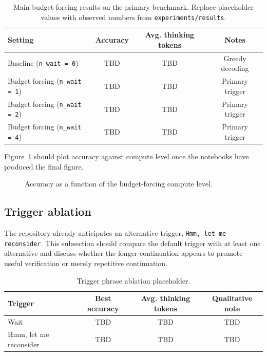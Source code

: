 \begin{table}[t]
\centering
\caption{Main budget-forcing results on the primary benchmark. Replace placeholder values with observed numbers from \texttt{experiments/results}.}
\label{tab:main-results}
\begin{tabular}{lccc}
\toprule
Setting & Accuracy & Avg. thinking tokens & Notes \\
\midrule
Baseline (\texttt{n\_wait = 0}) & TBD & TBD & Greedy decoding \\
Budget forcing (\texttt{n\_wait = 1}) & TBD & TBD & Primary trigger \\
Budget forcing (\texttt{n\_wait = 2}) & TBD & TBD & Primary trigger \\
Budget forcing (\texttt{n\_wait = 4}) & TBD & TBD & Primary trigger \\
\bottomrule
\end{tabular}
\end{table}

Figure~\ref{fig:acc-compute} should plot accuracy against compute level once the notebooks have produced the final figure.

\begin{figure}[t]
\centering
{}
\caption{Accuracy as a function of the budget-forcing compute level.}
\label{fig:acc-compute}
\end{figure}

\subsection{Trigger ablation}

The repository already anticipates an alternative trigger, \texttt{Hmm, let me reconsider}. This subsection should compare the default trigger with at least one alternative and discuss whether the longer continuation appears to promote useful verification or merely repetitive continuation.

\begin{table}[t]
\centering
\caption{Trigger phrase ablation placeholder.}
\label{tab:trigger-ablation}
\begin{tabular}{lccc}
\toprule
Trigger & Best accuracy & Avg. thinking tokens & Qualitative note \\
\midrule
Wait & TBD & TBD & TBD \\
Hmm, let me reconsider & TBD & TBD & TBD \\
\bottomrule
\end{tabular}
\end{table}

